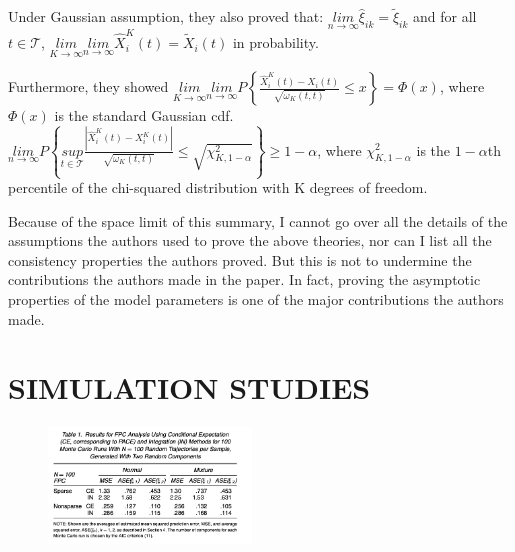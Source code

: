 \documentclass[11pt]{report}
\begin{document}
Under Gaussian assumption, they also proved that:
$\underset{n \rightarrow \infty}{lim} \hat{\xi}_{ik} = \tilde{\xi}_{ik}$ and for all $t \in \mathcal{T}$, $\underset{K \rightarrow \infty}{lim}\underset{n \rightarrow \infty}{lim} \widehat{X}_i^K(t) = \widetilde{X}_i(t)$ in probability. 

Furthermore, they showed $\underset{K \rightarrow \infty}{lim}\underset{n \rightarrow \infty}{lim} P\left\{\frac{\widehat{X}_i^K(t) - X_i(t)}{\sqrt{\omega_K(t,t)}} \leq x \right\} = \Phi(x) $, where $\Phi(x) $ is the standard Gaussian cdf. 
$\underset{n \rightarrow \infty}{lim} P\left\{ \underset{t \in \mathcal{T}}{sup} \frac{|\widehat{X}_i^K(t) - X_i^K(t)|}{\sqrt{\omega_K(t,t)}} \leq \sqrt{\chi_{K, 1-\alpha}^2} \right \} \geq 1-\alpha $, where $\chi_{K, 1-\alpha}^2$ is the $1-\alpha$th percentile of the chi-squared distribution with K degrees of freedom. 

Because of the space limit of this summary, I cannot go over all the details of the assumptions the authors used to prove the above theories, nor can I list all the consistency properties the authors proved. 
But this is not to undermine the contributions the authors made in the paper. 
In fact, proving the asymptotic properties of the model parameters is one of the major contributions the authors made.  


\section{SIMULATION STUDIES}
\label{simul}
\begin{figure}
  \centering
    \includegraphics[width=0.48\textwidth]{Figures/Table1.png}
   	\vspace{-0.5 cm}
\end{figure}
\end{document}
